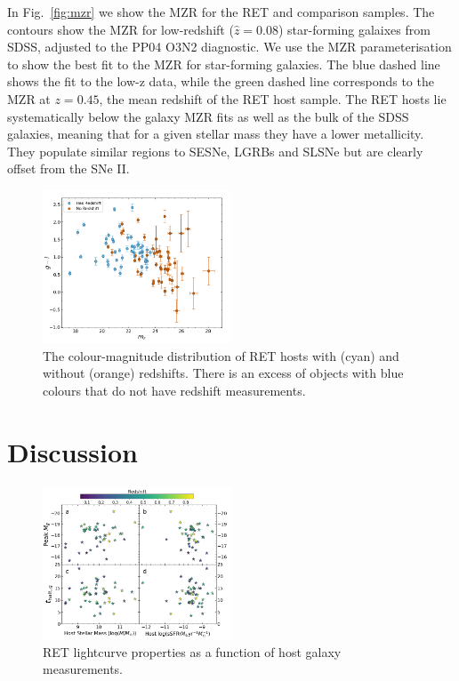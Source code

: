 \documentclass[fleqn,usenatbib,]{mnras}
\begin{document}
In Fig.~\ref{fig:mzr} we show the MZR for the RET and comparison samples. The contours show the MZR for low-redshift ($\hat{z}=0.08$) star-forming galaixes from SDSS, adjusted to the PP04 O3N2 diagnostic. We use the MZR parameterisation \citet{Zahid2014} to show the best fit to the MZR for star-forming galaxies. The blue dashed line shows the fit to the low-z data, while the green dashed line corresponds to the MZR at $z=0.45$, the mean redshift of the RET host sample. The RET hosts lie systematically below the galaxy MZR fits as well as the bulk of the SDSS galaxies, meaning that for a given stellar mass they have a lower metallicity. They populate similar regions to SESNe, LGRBs and SLSNe but are clearly offset from the SNe II.

\begin{figure}
\includegraphics[width=0.5\textwidth]{figs/mag_v_colour.png}
\caption{The colour-magnitude distribution of RET hosts with (cyan) and without (orange) redshifts. There is an excess of objects with blue colours that do not have redshift measurements.
\label{fig:g-i}}
\end{figure}

\section{Discussion}
\label{sec:disc}
\begin{figure}
\includegraphics[width=0.5\textwidth]{figs/RET_vs_host.png}
\caption{RET lightcurve properties as a function of host galaxy measurements.
\label{fig:ret_v_host}}
\end{figure}
\end{document}
